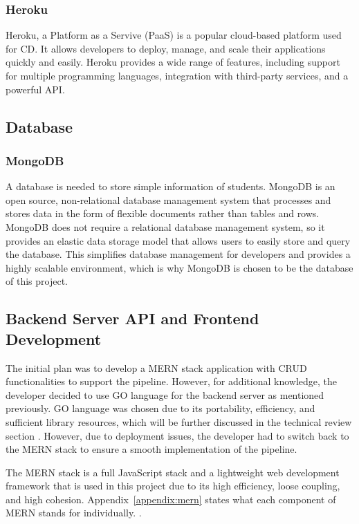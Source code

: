 \subsubsection{Heroku}
Heroku, a Platform as a Servive (PaaS) is a popular cloud-based platform used for CD. It allows developers to deploy, manage, and scale their applications quickly and easily. Heroku provides a wide range of features, including support for multiple programming languages, integration with third-party services, and a powerful API.

\subsection{Database}
\subsubsection{MongoDB}
A database is needed to store simple information of students. MongoDB is an open source, non-relational database management system that processes and stores data in the form of flexible documents rather than tables and rows. MongoDB does not require a relational database management system, so it provides an elastic data storage model that allows users to easily store and query the database. This simplifies database management for developers and provides a highly scalable environment, which is why MongoDB is chosen to be the database of this project.

\subsection{Backend Server API and Frontend Development}
The initial plan was to develop a MERN stack application with CRUD functionalities to support the pipeline. However, for additional knowledge, the developer decided to use GO language for the backend server as mentioned previously. GO language was chosen due to its portability, efficiency, and sufficient library resources, which will be further discussed in the technical review section \cite{mihalis, andrew, cgptt}. However, due to deployment issues, the developer had to switch back to the MERN stack to ensure a smooth implementation of the pipeline.

The MERN stack is a full JavaScript stack and a lightweight web development framework that is used in this project due to its high efficiency, loose coupling, and high cohesion. Appendix~\ref{appendix:mern} states what each component of MERN stands for individually. \cite{eddy, shama}.

